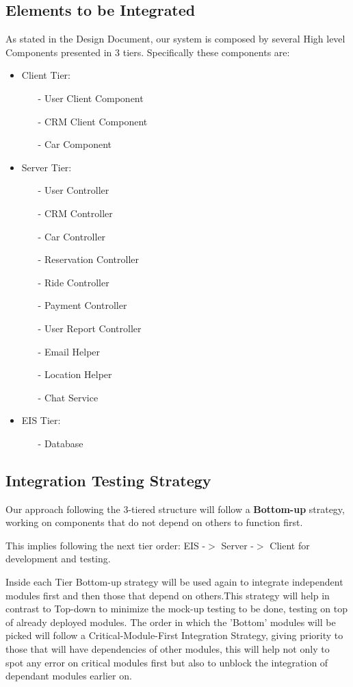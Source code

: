 \documentclass[a4paper]{article}
\begin{document}
\subsection{Elements to be Integrated}
As stated in the Design Document, our system is composed by several High level Components presented in 3 tiers. Specifically these components are:
\begin{itemize}
\item Client Tier:
\begin{itemize}
\item[-] User Client Component
\item[-] CRM Client Component
\item[-] Car Component
\end{itemize}
\item Server Tier:
\begin{itemize}
\item[-] User Controller
\item[-] CRM Controller
\item[-] Car Controller
\item[-] Reservation Controller
\item[-] Ride Controller
\item[-] Payment Controller
\item[-] User Report Controller
\item[-] Email Helper
\item[-] Location Helper
\item[-] Chat Service
\end{itemize}
\item EIS Tier:
\begin{itemize}
\item[-] Database
\end{itemize}
\end{itemize}

\subsection{Integration Testing Strategy}
Our approach following the 3-tiered structure will follow a \textbf{Bottom-up} strategy, working on components that do not depend on others to function first. \par
This implies following the next tier order: EIS -\(>\) Server -\(>\) Client for development and testing.\par
Inside each Tier Bottom-up strategy will be used again to integrate independent modules first and then those that depend on others.This strategy will help in contrast to Top-down to minimize the mock-up testing to be done, testing on top of already deployed modules. The order in which the 'Bottom' modules will be picked will follow a Critical-Module-First Integration Strategy, giving priority to those that will have dependencies of other modules, this will help not only to spot any error on critical modules first but also to unblock the integration of dependant modules earlier on.
\end{document}
